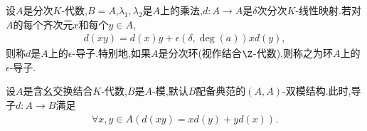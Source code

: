 \begin{definition}{}{}
	设$A$是分次$K$-代数,$B=A$,$\lambda_{1},\lambda_{2}$是$A$上的乘法,$d:A\to A$是$\delta$次分次$K$-线性映射.若对$A$的每个齐次元$x$和每个$y\in A$,
	\begin{align*}
		d\left(xy\right)=d\left(x\right)y+\epsilon\left(\delta,\deg\left(a\right)\right)xd\left(y\right),
	\end{align*}
	则称$d$是$A$上的$\epsilon$-导子.特别地,如果$A$是分次环(视作结合$\Z$-代数),则称之为环$A$上的$\epsilon$-导子.
\end{definition}

\begin{remark}{}{}
	设$A$是含幺交换结合$K$-代数,$B$是$A$-模,默认$B$配备典范的$\left(A,A\right)$-双模结构.此时,导子$d:A\to B$满足
	\begin{align*}
		\forall x,y\in A\left(d\left(xy\right)=xd\left(y\right)+yd\left(x\right)\right).
	\end{align*}
\end{remark}
